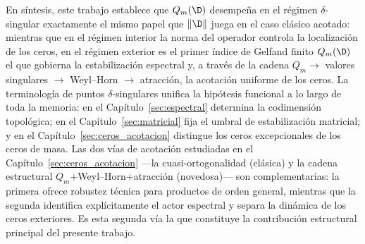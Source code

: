 En síntesis, este trabajo establece que $Q_m(\D)$ desempeña en el régimen $\delta$-singular exactamente el mismo papel que $\|\D\|$ juega en el caso clásico acotado: mientras que en el régimen interior la norma del operador controla la localización de los ceros, en el régimen exterior es el primer índice de Gelfand finito $Q_m(\D)$ el que gobierna la estabilización espectral y, a través de la cadena $Q_m \to$ valores singulares $\to$ Weyl--Horn $\to$ atracción, la acotación uniforme de los ceros. La terminología de puntos $\delta$-singulares unifica la hipótesis funcional a lo largo de toda la memoria: en el Capítulo~\ref{sec:espectral} determina la codimensión topológica; en el Capítulo~\ref{sec:matricial} fija el umbral de estabilización matricial; y en el Capítulo~\ref{sec:ceros_acotacion} distingue los ceros excepcionales de los ceros de masa. Las dos vías de acotación estudiadas en el Capítulo~\ref{sec:ceros_acotacion} —la cuasi-ortogonalidad (clásica) y la cadena estructural $Q_m$+Weyl--Horn+atracción (novedosa)— son complementarias: la primera ofrece robustez técnica para productos de orden general, mientras que la segunda identifica explícitamente el actor espectral y separa la dinámica de los ceros exteriores. Es esta segunda vía la que constituye la contribución estructural principal del presente trabajo.

